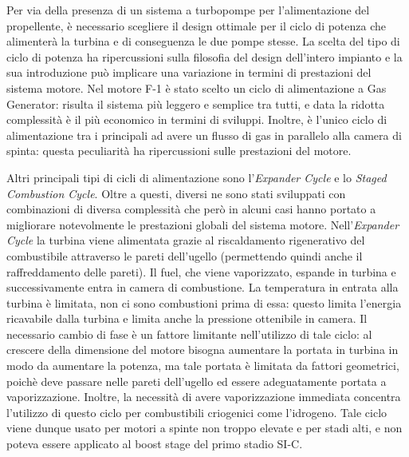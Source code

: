 Per via della presenza di un sistema a turbopompe per l'alimentazione del propellente, è necessario scegliere il design ottimale per il ciclo di potenza che alimenterà la turbina e di conseguenza le due pompe stesse.
La scelta del tipo di ciclo di potenza ha ripercussioni sulla filosofia del design dell'intero impianto e la sua introduzione può implicare una variazione in termini di prestazioni del sistema motore.
Nel motore F-1 è stato scelto un ciclo di alimentazione a Gas Generator: risulta il sistema più leggero e semplice tra tutti, e data la ridotta complessità è il più economico in termini di sviluppi.
Inoltre, è l'unico ciclo di alimentazione tra i principali ad avere un flusso di gas in parallelo alla camera di spinta: questa peculiarità ha ripercussioni sulle prestazioni del motore.

Altri principali tipi di cicli di alimentazione sono l'\textit{Expander Cycle} e lo \textit{Staged Combustion Cycle}. Oltre a questi, diversi ne sono stati sviluppati con combinazioni di diversa complessità che però in alcuni casi hanno portato a migliorare notevolmente le prestazioni globali del sistema motore.
Nell'\textit{Expander Cycle} la turbina viene alimentata grazie al riscaldamento rigenerativo del combustibile attraverso le pareti dell'ugello (permettendo quindi anche il raffreddamento delle pareti).
Il fuel, che viene vaporizzato, espande in turbina e successivamente entra in camera di combustione. La temperatura in entrata alla turbina è limitata, non ci sono combustioni prima di essa: questo limita l'energia ricavabile dalla turbina e limita anche la pressione ottenibile in camera.
Il necessario cambio di fase è un fattore limitante nell'utilizzo di tale ciclo: al crescere della dimensione del motore bisogna aumentare la portata in turbina in modo da aumentare la potenza, ma tale portata è limitata da fattori geometrici, poichè deve passare nelle pareti dell'ugello ed essere adeguatamente portata a vaporizzazione.
Inoltre, la necessità di avere vaporizzazione immediata concentra l'utilizzo di questo ciclo per combustibili criogenici come l'idrogeno. Tale ciclo viene dunque usato per motori a spinte non troppo elevate e per stadi alti, e non poteva essere applicato al boost stage del primo stadio SI-C.

